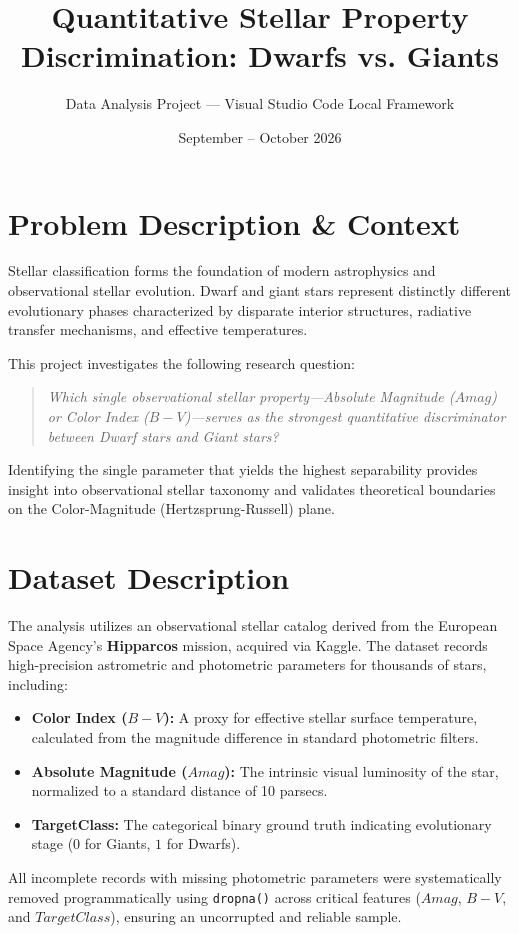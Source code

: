 \documentclass[11pt,a4paper]{article}
\title{\textbf{Quantitative Stellar Property Discrimination: Dwarfs vs. Giants}}
\author{Data Analysis Project --- Visual Studio Code Local Framework}
\date{September -- October 2026}
\begin{document}
\maketitle

\section{Problem Description \& Context}
Stellar classification forms the foundation of modern astrophysics and observational stellar evolution. Dwarf and giant stars represent distinctly different evolutionary phases characterized by disparate interior structures, radiative transfer mechanisms, and effective temperatures.

\noindent This project investigates the following research question:
\begin{quote}
\textit{Which single observational stellar property---Absolute Magnitude ($Amag$) or Color Index ($B-V$)---serves as the strongest quantitative discriminator between Dwarf stars and Giant stars?}
\end{quote}
Identifying the single parameter that yields the highest separability provides insight into observational stellar taxonomy and validates theoretical boundaries on the Color-Magnitude (Hertzsprung-Russell) plane.

\section{Dataset Description}
The analysis utilizes an observational stellar catalog derived from the European Space Agency's \textbf{Hipparcos} mission, acquired via Kaggle. The dataset records high-precision astrometric and photometric parameters for thousands of stars, including:
\begin{itemize}
    \item \textbf{Color Index ($B-V$):} A proxy for effective stellar surface temperature, calculated from the magnitude difference in standard photometric filters.
    \item \textbf{Absolute Magnitude ($Amag$):} The intrinsic visual luminosity of the star, normalized to a standard distance of 10 parsecs.
    \item \textbf{TargetClass:} The categorical binary ground truth indicating evolutionary stage ($0$ for Giants, $1$ for Dwarfs).
\end{itemize}
All incomplete records with missing photometric parameters were systematically removed programmatically using \texttt{dropna()} across critical features ($Amag$, $B-V$, and $TargetClass$), ensuring an uncorrupted and reliable sample.
\end{document}
